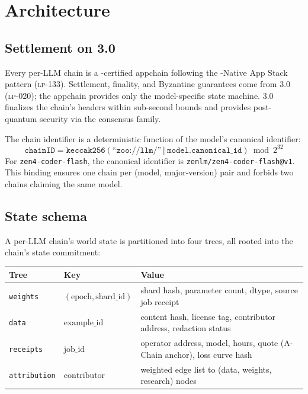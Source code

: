 \section{Architecture}
\label{sec:architecture}

\subsection{Settlement on \Quasar{} 3.0}

Every per-LLM chain is a \Quasar{}-certified appchain following the \Quasar{}-Native App Stack pattern (\textsc{lp-133}). Settlement, finality, and Byzantine guarantees come from \Quasar{} 3.0 (\textsc{lp-020}); the appchain provides only the model-specific state machine. \Quasar{} 3.0 finalizes the chain's headers within sub-second bounds and provides post-quantum security via the \Quasar{} consensus family.

The chain identifier is a deterministic function of the model's canonical identifier:
\begin{equation}
\texttt{chainID} = \texttt{keccak256}(\texttt{``zoo://llm/''} \,\Vert\, \texttt{model.canonical\_id}) \bmod 2^{32}
\end{equation}
For \texttt{zen4-coder-flash}, the canonical identifier is \texttt{zenlm/zen4-coder-flash@v1}. This binding ensures one chain per (model, major-version) pair and forbids two chains claiming the same model.

\subsection{State schema}

A per-LLM chain's world state is partitioned into four trees, all rooted into the chain's state commitment:

\begin{longtable}{p{3.5cm}p{4cm}p{6.5cm}}
\toprule
\textbf{Tree} & \textbf{Key} & \textbf{Value} \\
\midrule
\endhead
\texttt{weights} & $(\text{epoch}, \text{shard\_id})$ & shard hash, parameter count, dtype, source job receipt \\
\texttt{data} & $\text{example\_id}$ & content hash, license tag, contributor address, redaction status \\
\texttt{receipts} & $\text{job\_id}$ & operator address, \GPU{} model, hours, \TEE{} quote (A-Chain anchor), loss curve hash \\
\texttt{attribution} & $\text{contributor}$ & weighted edge list to (data, weights, research) nodes \\
\bottomrule
\end{longtable}

